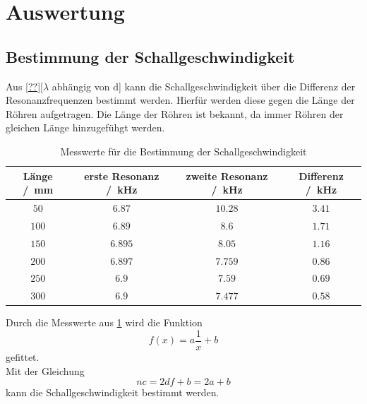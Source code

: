 \section{Auswertung}
\label{sec:Auswertung}
\subsection{Bestimmung der Schallgeschwindigkeit}
Aus \eqref{??}[$\lambda$ abhängig von d] kann die Schallgeschwindigkeit über die Differenz der Resonanzfrequenzen
bestimmt werden. Hierfür werden diese gegen die Länge der Röhren aufgetragen. Die Länge der Röhren ist bekannt, da immer Röhren 
der gleichen Länge hinzugefühgt werden.
\FloatBarrier
\begin{table}
    \centering
    \caption{Messwerte für die Bestimmung der Schallgeschwindigkeit}
    \label{tab:Schallgeschwindigkeit}
    \begin{tabular}{c c c c}
        \toprule
        Länge /\SI{}{\milli\meter}& erste Resonanz /\SI{}{\kilo\hertz} & zweite Resonanz /\SI{}{\kilo\hertz}& Differenz /\SI{}{\kilo\hertz}\\
        \midrule
        $\num{50}$&$\num{6.87}$&$\num{10.28}$&$\num{3.41}$\\
        $\num{100}$&$\num{6.89}$&$\num{8.6}$&$\num{1.71}$\\
        $\num{150}$&$\num{6.895}$&$\num{8.05}$&$\num{1.16}$\\
        $\num{200}$&$\num{6.897}$&$\num{7.759}$&$\num{0.86}$\\
        $\num{250}$&$\num{6.9}$&$\num{7.59}$&$\num{0.69}$\\
        $\num{300}$&$\num{6.9}$&$\num{7.477}$&$\num{0.58}$\\
        \bottomrule
    \end{tabular}
\end{table}
\FloatBarrier
Durch die Messwerte aus \ref{tab:Schallgeschwindigkeit} wird die Funktion
\begin{equation*}
    f(x) = a \frac{1}{x} + b
\end{equation*}
gefittet.\\
Mit der Gleichung 
\begin{equation*}
    nc = 2df +b =2a+b
\end{equation*}
kann die Schallgeschwindigkeit bestimmt werden.
\FloatBarrier

